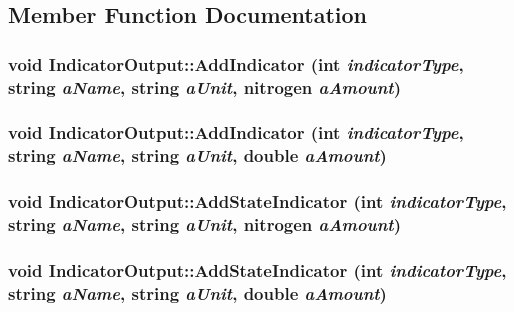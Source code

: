 \subsection{Member Function Documentation}
\hypertarget{class_indicator_output_a2b07637be2883b515b05d538a7b444de}{
\subsubsection[{AddIndicator}]{\setlength{\rightskip}{0pt plus 5cm}void IndicatorOutput::AddIndicator (int {\em indicatorType}, \/  string {\em aName}, \/  string {\em aUnit}, \/  {\bf nitrogen} {\em aAmount})}}
\label{class_indicator_output_a2b07637be2883b515b05d538a7b444de}
\hypertarget{class_indicator_output_a50aa53ae58d243f6eef65a360e1196c8}{
\subsubsection[{AddIndicator}]{\setlength{\rightskip}{0pt plus 5cm}void IndicatorOutput::AddIndicator (int {\em indicatorType}, \/  string {\em aName}, \/  string {\em aUnit}, \/  double {\em aAmount})}}
\label{class_indicator_output_a50aa53ae58d243f6eef65a360e1196c8}
\hypertarget{class_indicator_output_ab31b639c00e3801c90b4faef370602e1}{
\subsubsection[{AddStateIndicator}]{\setlength{\rightskip}{0pt plus 5cm}void IndicatorOutput::AddStateIndicator (int {\em indicatorType}, \/  string {\em aName}, \/  string {\em aUnit}, \/  {\bf nitrogen} {\em aAmount})}}
\label{class_indicator_output_ab31b639c00e3801c90b4faef370602e1}
\hypertarget{class_indicator_output_a1a631aa0f783160f5c12f0ad12e67c37}{
\subsubsection[{AddStateIndicator}]{\setlength{\rightskip}{0pt plus 5cm}void IndicatorOutput::AddStateIndicator (int {\em indicatorType}, \/  string {\em aName}, \/  string {\em aUnit}, \/  double {\em aAmount})}}
